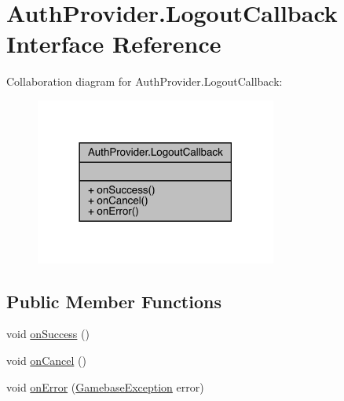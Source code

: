 \hypertarget{interfacecom_1_1toast_1_1android_1_1gamebase_1_1base_1_1auth_1_1_auth_provider_1_1_logout_callback}{}\section{Auth\+Provider.\+Logout\+Callback Interface Reference}
\label{interfacecom_1_1toast_1_1android_1_1gamebase_1_1base_1_1auth_1_1_auth_provider_1_1_logout_callback}


Collaboration diagram for Auth\+Provider.\+Logout\+Callback\+:
\nopagebreak
\begin{figure}[H]
\begin{center}
\leavevmode
\includegraphics[width=225pt]{interfacecom_1_1toast_1_1android_1_1gamebase_1_1base_1_1auth_1_1_auth_provider_1_1_logout_callback__coll__graph}
\end{center}
\end{figure}
\subsection*{Public Member Functions}
\begin{DoxyCompactItemize}
\item 
void \hyperlink{interfacecom_1_1toast_1_1android_1_1gamebase_1_1base_1_1auth_1_1_auth_provider_1_1_logout_callback_a6ecba2d0ac542f91a477cfe6ce25b102}{on\+Success} ()
\item 
void \hyperlink{interfacecom_1_1toast_1_1android_1_1gamebase_1_1base_1_1auth_1_1_auth_provider_1_1_logout_callback_a5a5a8c7638e17aa6d75298875b91a597}{on\+Cancel} ()
\item 
void \hyperlink{interfacecom_1_1toast_1_1android_1_1gamebase_1_1base_1_1auth_1_1_auth_provider_1_1_logout_callback_aa7fdd9a38f0067a729ab73deef9c9003}{on\+Error} (\hyperlink{classcom_1_1toast_1_1android_1_1gamebase_1_1base_1_1_gamebase_exception}{Gamebase\+Exception} error)
\end{DoxyCompactItemize}


